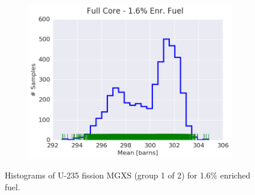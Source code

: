 \begin{figure}[h!]
\begin{subfigure}{0.5\textwidth}
  \includegraphics[width=\linewidth]{figures/patterns/full-core/hist-kde-rug/16-enr-fiss-2} \caption{}
  \label{fig:chap9-hist-full-core-1.6-fiss}
\end{subfigure}
\caption[Histogram of U-235 fission MGXS for 1.6\% enriched fuel]{Histograms of U-235 fission \ac{MGXS} (group 1 of 2) for 1.6\% enriched fuel.}
\label{fig:chap9-hist-1.6-fiss}
\end{figure}

